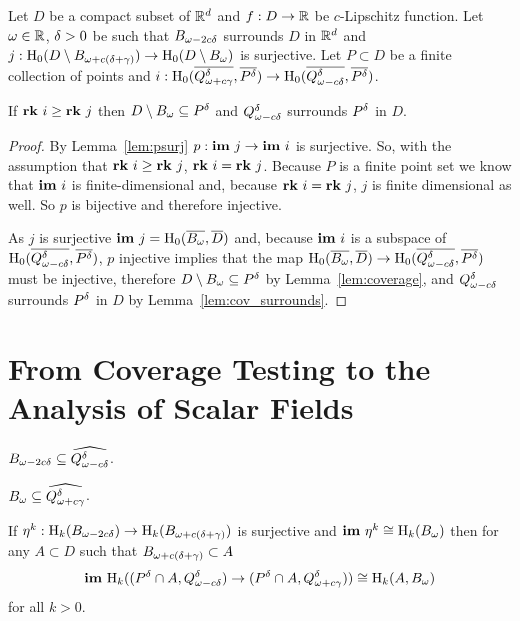 \begin{theorem}
  Let $D$ be a compact subset of $\R^d$ and $f : D\to\R$ be $c$-Lipschitz function.
  Let $\omega\in\R$, $\of > 0$ be such that $\b$ surrounds $D$ in $\R^d$ and $j : \hom_0(D\setminus \BB)\to \hom_0(D\setminus\bb)$ is surjective.
  Let $P\subset D$ be a finite collection of points and $i : \hom_0(\cmp{\QQ^\of}, \cmp{\P})\to \hom_0(\cmp{\Q^\of}, \cmp{\P})$.

  If $\rk~i\geq \rk~j$ then $D\setminus \bb\subseteq \P$ and $\Q^\of$ surrounds $\P$ in $D$.
\end{theorem}
\begin{proof}

  By Lemma~\ref{lem:psurj} $p :\im~j\to \im~i$ is surjective.
  So, with the assumption that $\rk~i\geq \rk~j$, $\rk~i = \rk~j$.
  Because $P$ is a finite point set we know that $\im~i$ is finite-dimensional and, because $\rk~i = \rk~j$, $j$ is finite dimensional as well.
  So $p$ is bijective and therefore injective.

  As $j$ is surjective $\im~j = \hom_0(\cmp{\bb}, \cmp{D})$ and, because $\im~i$ is a subspace of $\hom_0(\cmp{\Q^\of}, \cmp{\P})$, $p$ injective implies that the map $\hom_0(\cmp{\bb}, \cmp{D})\to \hom_0(\cmp{\Q^\of}, \cmp{\P})$ must be injective, therefore $D\setminus\bb\subseteq \P$ by Lemma~\ref{lem:coverage}, and $\Q^\of$ surrounds $\P$ in $D$ by Lemma~\ref{lem:cov_surrounds}.
\end{proof}

\clearpage

\section{From Coverage Testing to the Analysis of Scalar Fields}

\begin{lemma}
  $\b\subseteq \widehat{\Q^\of}$.
\end{lemma}

\begin{lemma}
  $\B\subseteq \widehat{\QQ^\of}$.
\end{lemma}

\begin{corollary}
  If $\eta^k : \hom_k(\b)\to \hom_k(\BB)$ is surjective and $\im~\eta^k\cong \hom_k(\bb)$ then for any $A\subset D$ such that $\BB\subset A$
  \[ \im~\hom_k((\P\cap A, \Q^\of)\to (\P\cap A, \QQ^\of))\cong \hom_k(A, \bb)\]
  for all $k > 0$.
\end{corollary}

